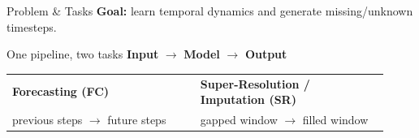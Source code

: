 \begin{frame}{Problem \& Tasks}
\vspace{-0.2em}
\textbf{Goal:} learn temporal dynamics and generate missing/unknown timesteps.

\vspace{0.7em}
\begin{block}{One pipeline, two tasks}
\centering
\textbf{Input} $\rightarrow$ \textbf{Model} $\rightarrow$ \textbf{Output}\\[0.9em]

\vspace{2em}

\begin{tabular}{p{0.46\linewidth} p{0.46\linewidth}}
\textbf{Forecasting (FC)} & \textbf{Super-Resolution / Imputation (SR)} \\
previous steps $\rightarrow$ future steps & gapped window $\rightarrow$ filled window \\
\end{tabular}
\end{block}


\end{frame}